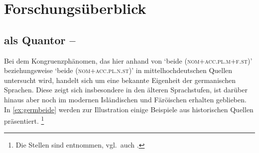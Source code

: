 \chapter{Forschungsüberblick}
\label{ch:forschungsueberblick}

\section%
	{ als Quantor -- }
\label{sec:ovwbeidequant}

Bei dem Kongruenzphänomen, das hier anhand von 
`beide (\textsc{nom+acc.pl.m+f.st})' beziehungsweise 
`beide (\textsc{nom+acc.pl.n.st})' in mittelhochdeutschen Quellen
untersucht wird, handelt sich um eine bekannte Eigenheit der germanischen
Sprachen. Diese zeigt sich insbesondere in den älteren Sprachstufen, ist
darüber hinaus aber noch im modernen Isländischen
\autocites[283]{corbett1991}[569]{wechsler2009} und Färöischen
\autocite[225--226]{thrainsson2004} erhalten geblieben. In \cref{ex:germbeide}
werden zur Illustration einige Beispiele aus historischen Quellen präsentiert.%
%
	\footnote{Die Stellen sind \citet[12]{askedal1973} entnommen, vgl.~auch
		\citet{hock2008,hock2009}.}

